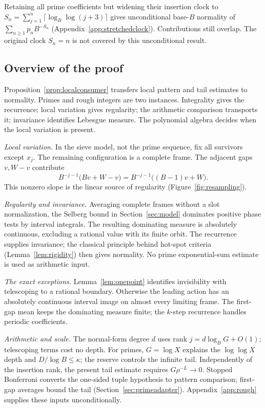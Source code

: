 \documentclass[11pt,a4paper]{article}
\begin{document}
Retaining all prime coefficients but widening their insertion clock to
$S_n=\sum_{j=1}^n\lceil\log_B\log(j+3)\rceil$ gives unconditional
base-$B$ normality of $\sum_{n\ge1}p_nB^{-S_n}$
(Appendix~\ref{app:stretchedclock}). Contributions still overlap.
The original clock $S_n=n$ is not covered by this unconditional result.

\subsection{Overview of the proof}\label{sec:overview}

Proposition~\ref{prop:localconsumer} transfers local pattern and tail
estimates to normality. Primes and rough integers are two instances.
Integrality gives the recurrence; local variation gives regularity;
the arithmetic comparison transports it; invariance identifies Lebesgue measure.
The polynomial algebra decides when the local variation is present.

\emph{Local variation.}
In the sieve model, not the prime sequence, fix all survivors except $x_j$.
The remaining configuration is a complete frame. The adjacent gaps
$v,W-v$ contribute
\[
 B^{-j-1}\bigl(Bv+W-v\bigr)=B^{-j-1}\bigl((B-1)v+W\bigr).
\]
This nonzero slope is the linear source of regularity
(Figure~\ref{fig:resampling}).

\emph{Regularity and invariance.}
Averaging complete frames without a slot normalization, the Selberg
bound in Section~\ref{sec:model} dominates positive phase tests by
interval integrals. The resulting dominating measure is absolutely
continuous, excluding a rational value with its finite orbit.
The recurrence supplies invariance; the classical principle behind
hot-spot criteria (Lemma~\ref{lem:rigidity}) then gives normality.
No prime exponential-sum estimate is used as arithmetic input.

\emph{The exact exceptions.}
Lemma~\ref{lem:onepoint} identifies invisibility with telescoping to a
rational boundary. Otherwise the leading action has an absolutely
continuous interval image on almost every limiting frame.
The first-gap mean keeps the dominating measure finite;
the $k$-step recurrence handles periodic coefficients.

\emph{Arithmetic and scale.}
The normal-form degree $d$ uses rank $j=d\log_B G+O(1)$;
telescoping terms cost no depth.
For primes, $G=\log X$ explains the $\log\log X$ depth and
$D/\log B\le\kappa$; the reserve controls the infinite tail.
Independently of the insertion rank, the present tail estimate requires
$G\rho^{-L}\to0$.
Stopped Bonferroni converts the one-sided tuple hypothesis to pattern
comparison; first-gap averages bound the tail
(Section~\ref{sec:primeadapter}). Appendix~\ref{app:rough} supplies
these inputs unconditionally.
\end{document}
